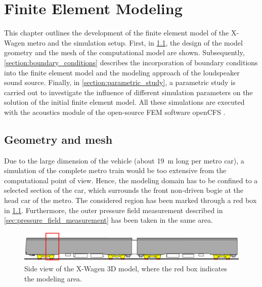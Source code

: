 \chapter{Finite Element Modeling}
\label{chap:FEM}

This chapter outlines the development of the finite element model of the X-Wagen metro and the simulation setup. First, in \cref{section:geometry}, the design of the model geometry and the mesh of the computational model are shown.
Subsequently, \cref{section:boundary_conditions} describes the incorporation of boundary conditions into the finite element model and the modeling approach of the loudspeaker sound source. 
Finally, in \cref{section:parametric_study}, a parametric study is carried out to investigate the influence of different simulation parameters on the solution of the initial finite element model.
All these simulations are executed with the acoustics module of the open-source FEM software openCFS \cite{opencfs}.


\section{Geometry and mesh}
\label{section:geometry}

Due to the large dimension of the vehicle (about \SI{19}{\meter} long per metro car), a simulation of the complete metro train would be too extensive from the computational point of view. Hence, the modeling domain has to be confined to a selected section of the car, which surrounds the front non-driven bogie at the head car of the metro. The considered region has been marked through a red box in \cref{fig:red_box}. Furthermore, the outer pressure field measurement described in \cref{sec:pressure_field_measurement} has been taken in the same area.
\begin{figure}
	\centering
	\includegraphics[width=\textwidth]{fig/chap4/geometry/model_area.png}
	\caption{Side view of the X-Wagen 3D model, where the red box indicates the modeling area.}
	\label{fig:red_box}
\end{figure}

